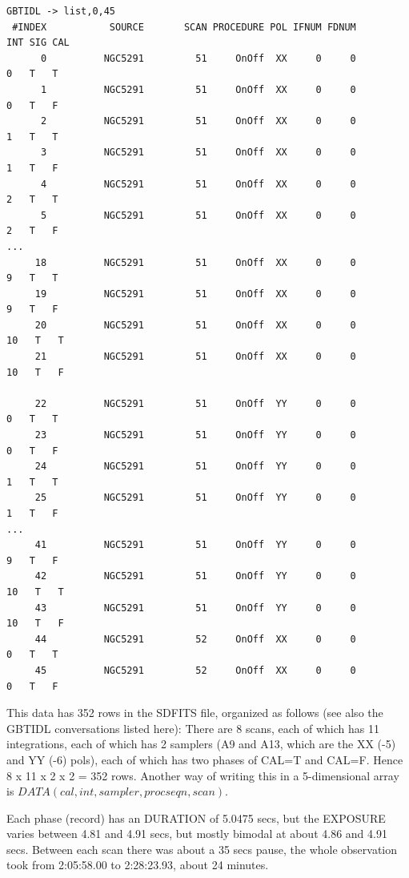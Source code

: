 \documentclass[12pt,a4paper]{article}
\begin{document}
\begin{lstlisting}  
GBTIDL -> list,0,45
 #INDEX           SOURCE       SCAN PROCEDURE POL IFNUM FDNUM        INT SIG CAL
      0          NGC5291         51     OnOff  XX     0     0          0   T   T
      1          NGC5291         51     OnOff  XX     0     0          0   T   F
      2          NGC5291         51     OnOff  XX     0     0          1   T   T
      3          NGC5291         51     OnOff  XX     0     0          1   T   F
      4          NGC5291         51     OnOff  XX     0     0          2   T   T
      5          NGC5291         51     OnOff  XX     0     0          2   T   F
...
     18          NGC5291         51     OnOff  XX     0     0          9   T   T
     19          NGC5291         51     OnOff  XX     0     0          9   T   F
     20          NGC5291         51     OnOff  XX     0     0         10   T   T
     21          NGC5291         51     OnOff  XX     0     0         10   T   F
     
     22          NGC5291         51     OnOff  YY     0     0          0   T   T
     23          NGC5291         51     OnOff  YY     0     0          0   T   F
     24          NGC5291         51     OnOff  YY     0     0          1   T   T
     25          NGC5291         51     OnOff  YY     0     0          1   T   F
...
     41          NGC5291         51     OnOff  YY     0     0          9   T   F
     42          NGC5291         51     OnOff  YY     0     0         10   T   T
     43          NGC5291         51     OnOff  YY     0     0         10   T   F
     44          NGC5291         52     OnOff  XX     0     0          0   T   T
     45          NGC5291         52     OnOff  XX     0     0          0   T   F
\end{lstlisting}

This data has 352 rows in the SDFITS file, organized as follows (see also the GBTIDL
conversations listed here):  There are 8 scans, each of which has 11 integrations, each of
which has 2 samplers (A9 and A13, which are the XX (-5) and YY (-6) pols), each of which has
two phases of CAL=T and CAL=F. Hence 8 x 11 x 2 x 2 = 352 rows. Another way of writing this in a
5-dimensional array is $DATA(cal,int,sampler,procseqn,scan)$.

Each phase (record) has an DURATION
of 5.0475 secs, but the EXPOSURE varies between 4.81 and 4.91 secs, but mostly bimodal
at about 4.86 and 4.91 secs.  Between each scan there was about a 35 secs pause, the
whole observation took from 2:05:58.00 to 2:28:23.93, about 24 minutes.
\end{document}
